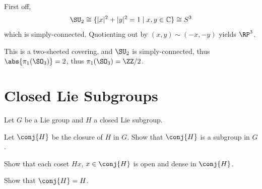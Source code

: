 \documentclass[11pt, headheight=30pt]{scrartcl}
\begin{document}
\begin{psec*}
    First off,
    \[
        \SU_2\cong \{|x|^2+|y|^2=1 \mid x,y \in \mathbb C\}\cong S^3    
    \]
    which is simply-connected.
    Quotienting out by $(x,y)\sim (-x,-y)$ yields $\RP^3$.

    This is a two-sheeted covering, and $\SU_2$ is simply-connected,
    thus $\abs{\pi_1(\SO_3)} = 2$, thus $\pi_1(\SO_3) = \ZZ/2$.
\end{psec*}

\section{Closed Lie Subgroups}
\begin{prob}
    Let $G$ be a Lie group and $H$ a closed Lie subgroup.
    \begin{walk}
        \item Let $\conj{H}$ be the closure of $H$ in $G$.
        Show that $\conj{H}$ is a subgroup in $G$.
        \item Show that each coset $Hx$, $x\in \conj{H}$ is open and dense in $\conj{H}$.
        \item Show that $\conj{H} = H$.
    \end{walk}
\end{prob}

\end{document}
